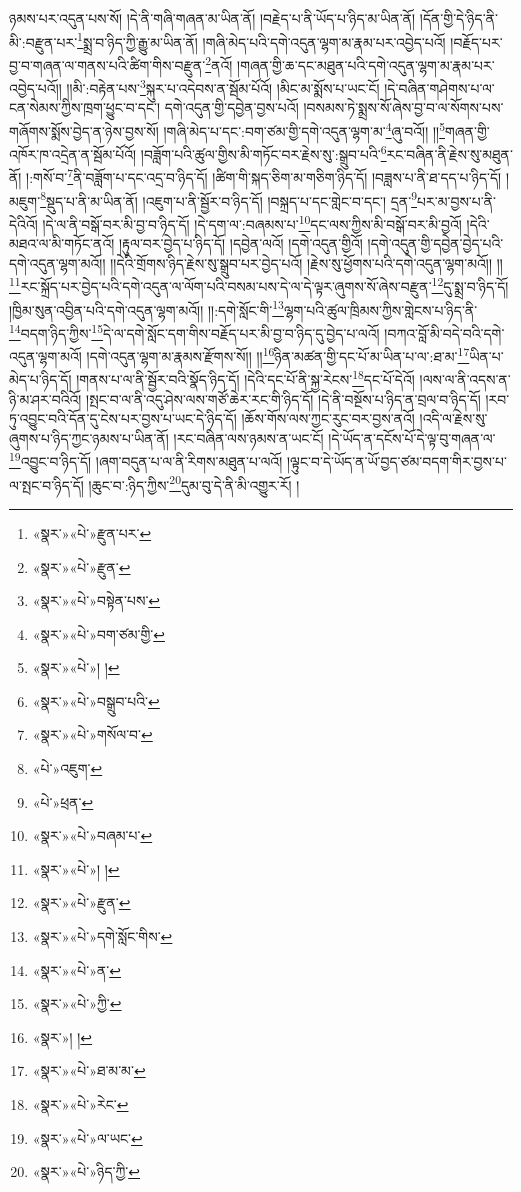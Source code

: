 ཉམས་པར་འདུན་པས་སོ། །དེ་ནི་གཞི་གཞན་མ་ཡིན་ནོ། །བརྗེད་པ་ནི་ཡོད་པ་ཉིད་མ་ཡིན་ནོ། །དོན་གྱི་དེ་ཉིད་ནི་མི་:བརྫུན་པར་\footnote{«སྣར་»«པེ་»རྫུན་པར་}སྨྲ་བ་ཉིད་ཀྱི་རྒྱུ་མ་ཡིན་ནོ། །གཞི་མེད་པའི་དགེ་འདུན་ལྷག་མ་རྣམ་པར་འབྱེད་པའོ། །བརྗོད་པར་བྱ་བ་གཞན་ལ་གནས་པའི་ཚིག་གིས་བརྫུན་\footnote{«སྣར་»«པེ་»རྫུན་}ནའོ། །གཞན་གྱི་ཆ་དང་མཐུན་པའི་དགེ་འདུན་ལྷག་མ་རྣམ་པར་འབྱེད་པའོ།། །།མི་:བརྟེན་པས་\footnote{«སྣར་»«པེ་»བསྟེན་པས་}སྐུར་པ་འདེབས་ན་སྦོམ་པོའོ། །མིང་མ་སྨོས་པ་ཡང་ངོ། །དེ་བཞིན་གཤེགས་པ་ལ་ངན་སེམས་ཀྱིས་ཁྲག་ཕྱུང་བ་དང་། དགེ་འདུན་གྱི་དབྱེན་བྱས་པའོ། །བསམས་ཏེ་སྨྲས་སོ་ཞེས་བྱ་བ་ལ་སོགས་པས་གཞོགས་སྨོས་བྱེད་ན་ཉེས་བྱས་སོ། །གཞི་མེད་པ་དང་:བག་ཙམ་གྱི་དགེ་འདུན་ལྷག་མ་\footnote{«སྣར་»«པེ་»བག་ཙམ་གྱི་}ཞུ་བའོ།། །།\footnote{«སྣར་»«པེ་»། །}གཞན་གྱི་འཁོར་ཁ་འདྲེན་ན་སྦོམ་པོའོ། །བཟློག་པའི་ཚུལ་གྱིས་མི་གཏོང་བར་རྗེས་སུ་:སྒྲུབ་པའི་\footnote{«སྣར་»«པེ་»བསྒྲུབ་པའི་}རང་བཞིན་ནི་རྗེས་སུ་མཐུན་ནོ། །:གསོ་བ་\footnote{«སྣར་»«པེ་»གསོལ་བ་}ནི་བཟློག་པ་དང་འདྲ་བ་ཉིད་དོ། །ཚིག་གི་སྐད་ཅིག་མ་གཅིག་ཉིད་དོ། །བཟླས་པ་ནི་ཐ་དད་པ་ཉིད་དོ། །མཇུག་\footnote{«པེ་»འཇུག་}སྡུད་པ་ནི་མ་ཡིན་ནོ། །འཇུག་པ་ནི་སྦྱོར་བ་ཉིད་དོ། །བསྐྲད་པ་དང་གླེང་བ་དང་། དྲན་\footnote{«པེ་»ཕྲན་}པར་མ་བྱས་པ་ནི་དེའིའོ། །དེ་ལ་ནི་བསྒོ་བར་མི་བྱ་བ་ཉིད་དོ། །དེ་དག་ལ་:བཞམས་པ་\footnote{«སྣར་»«པེ་»བཞམ་པ་}དང་ལས་ཀྱིས་མི་བསྒོ་བར་མི་བྱའོ། །དེའི་མཐའ་ལ་མི་གཏོང་ནའོ། །རྟུལ་བར་བྱེད་པ་ཉིད་དོ། །དབྱེན་ལའོ། །དགེ་འདུན་གྱིའོ། །དགེ་འདུན་གྱི་དབྱེན་བྱེད་པའི་དགེ་འདུན་ལྷག་མའོ།། །།དེའི་གྲོགས་ཉིད་རྗེས་སུ་སྒྲུབ་པར་བྱེད་པའོ། །རྗེས་སུ་ཕྱོགས་པའི་དགེ་འདུན་ལྷག་མའོ།། །།\footnote{«སྣར་»«པེ་»། །}རང་སྐྲོད་པར་བྱེད་པའི་དགེ་འདུན་ལ་ལོག་པའི་བསམ་པས་དེ་ལ་དེ་ལྟར་ཞུགས་སོ་ཞེས་བརྫུན་\footnote{«སྣར་»«པེ་»རྫུན་}དུ་སྨྲ་བ་ཉིད་དོ། །ཁྱིམ་སུན་འབྱིན་པའི་དགེ་འདུན་ལྷག་མའོ།། །།:དགེ་སློང་གི་\footnote{«སྣར་»«པེ་»དགེ་སློང་གིས་}ལྷག་པའི་ཚུལ་ཁྲིམས་ཀྱིས་གླེངས་པ་ཉིད་ནི་\footnote{«སྣར་»«པེ་»ན་}བདག་ཉིད་ཀྱིས་\footnote{«སྣར་»«པེ་»ཀྱི་}དེ་ལ་དགེ་སློང་དག་གིས་བརྗོད་པར་མི་བྱ་བ་ཉིད་དུ་བྱེད་པ་ལའོ། །བཀའ་བློ་མི་བདེ་བའི་དགེ་འདུན་ལྷག་མའོ། །དགེ་འདུན་ལྷག་མ་རྣམས་རྫོགས་སོ།། །།\footnote{«སྣར་»། །}ཉིན་མཚན་གྱི་དང་པོ་མ་ཡིན་པ་ལ་:ཐ་མ་\footnote{«སྣར་»«པེ་»ཐ་མ་མ་}ཡིན་པ་མེད་པ་ཉིད་དོ། །གནས་པ་ལ་ནི་སྦྱོར་བའི་སྣོད་ཉིད་དོ། །དེའི་དང་པོ་ནི་སྐྱ་རེངས་\footnote{«སྣར་»«པེ་»རེང་}དང་པོ་དེའོ། །ལས་ལ་ནི་འདས་ན་ཉི་མ་ཤར་བའིའོ། །སྤང་བ་ལ་ནི་འདུ་ཤེས་ལས་གཙོ་ཆེར་རང་གི་ཉིད་དོ། །དེ་ནི་བསྔོས་པ་ཉིད་ན་བྲལ་བ་ཉིད་དོ། །རབ་ཏུ་འབྱུང་བའི་དོན་དུ་ངེས་པར་བྱས་པ་ཡང་དེ་ཉིད་དོ། །ཆོས་གོས་ལས་ཀྱང་རུང་བར་བྱས་ནའོ། །འདི་ལ་རྗེས་སུ་ཞུགས་པ་ཉིད་ཀྱང་ཉམས་པ་ཡིན་ནོ། །རང་བཞིན་ལས་ཉམས་ན་ཡང་ངོ། །དེ་ཡོད་ན་དངོས་པོ་དེ་ལྟ་བུ་གཞན་ལ་\footnote{«སྣར་»«པེ་»ལ་ཡང་}འབྱུང་བ་ཉིད་དོ། །ཞག་བདུན་པ་ལ་ནི་རིགས་མཐུན་པ་ལའོ། །ལྟུང་བ་དེ་ཡོད་ན་ཡོ་བྱད་ཙམ་བདག་གིར་བྱས་པ་ལ་སྤང་བ་ཉིད་དོ། །ཆུང་བ་:ཉིད་ཀྱིས་\footnote{«སྣར་»«པེ་»ཉིད་ཀྱི་}དུམ་བུ་དེ་ནི་མི་འགྱུར་རོ། །
